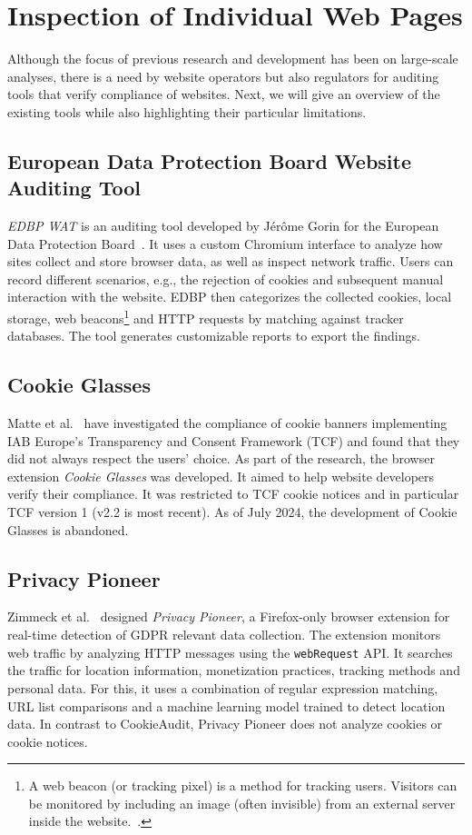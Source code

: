 \section{Inspection of Individual Web Pages}
Although the focus of previous research and development has been on large-scale analyses, there is a need by website operators but also regulators for auditing tools that verify compliance of websites.
Next, we will give an overview of the existing tools while also highlighting their particular limitations.

\subsection{European Data Protection Board Website Auditing Tool}
\emph{EDBP WAT} is an auditing tool developed by Jérôme Gorin for the European Data Protection Board~\cite{gorin2024edpb}.
It uses a custom Chromium interface to analyze how sites collect and store browser data, as well as inspect network traffic. 
Users can record different scenarios, e.g., the rejection of cookies and subsequent manual interaction with the website.
EDBP then categorizes the collected cookies, local storage, web beacons\footnote{
A web beacon (or tracking pixel) is a method for tracking users. 
Visitors can be monitored by including an image (often invisible) from an external server inside the website.~\cite{smith1999web}.
} and HTTP requests by matching against tracker databases.
The tool generates customizable reports to export the findings.

\subsection{Cookie Glasses}
Matte et al.~\cite{matte2020cookiebannersrespectchoice} have investigated the compliance of cookie banners implementing IAB Europe’s Transparency and Consent Framework (TCF) and found that they did not always respect the users' choice.
As part of the research, the browser extension \emph{Cookie Glasses} was developed.
It aimed to help website developers verify their compliance.
It was restricted to TCF cookie notices and in particular TCF version 1 (v2.2 is most recent).
As of July 2024, the development of Cookie Glasses is abandoned.

\subsection{Privacy Pioneer}
Zimmeck et al.~\cite{zimmeck2024pioneer} designed \emph{Privacy Pioneer}, a Firefox-only browser extension for real-time detection of GDPR relevant data collection.
The extension monitors web traffic by analyzing HTTP messages using the \verb|webRequest| API.
It searches the traffic for location information, monetization practices, tracking methods and personal data. 
For this, it uses a combination of regular expression matching, URL list comparisons and a machine learning model trained to detect location data.
In contrast to CookieAudit, Privacy Pioneer does not analyze cookies or cookie notices.

